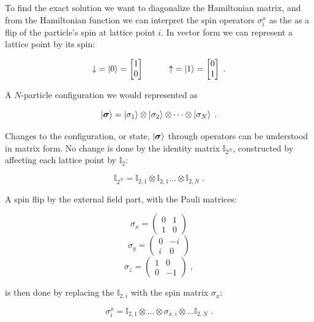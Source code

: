 To find the exact solution we want to diagonalize the Hamiltonian matrix, and from the Hamiltonian function we can interpret the spin operators $\sigma_i^x$ as the as a flip of the particle's spin at lattice point $i$. In vector form we can represent a lattice point by its spin:

\begin{equation}
  \downarrow \; = \ket{0} = \begin{bmatrix}
    1 \\ 0
    \end{bmatrix} \space\space\space\;\;\;\;\;\;\; \;\;\; \space\space\space \uparrow \; = \ket{1} = \begin{bmatrix}
  0 \\ 1
  \end{bmatrix} \; .
  \label{eq:ising_basis}
\end{equation}

A $N$-particle configuration we would represented as

$$\ket{\boldsymbol{\sigma}} = \ket{\sigma_1} \otimes \ket{\sigma_2} \otimes \dots \otimes \ket{\sigma_N} \; .$$

Changes to the configuration, or state, $\ket{\boldsymbol{\sigma}}$ through operators can be understood in matrix form. No change is done by the identity matrix $\mathbb{I}_{2^N}$, constructed by affecting each lattice point by $\mathbb{I}_2$:

$$\mathbb{I}_{2^N} = \mathbb{I}_{2, 1} \otimes \mathbb{I}_{2, 1} ... \otimes \mathbb{I}_{2, N} \; .$$

A spin flip by the external field part, with the Pauli matrices:

\[
\sigma_x =
\begin{pmatrix}0&1\\1&0\end{pmatrix}
\]
\[
\sigma_y =
\begin{pmatrix}0&-i\\i&0\end{pmatrix} 
\]
\[
\sigma_z =
\begin{pmatrix}1&0\\0&-1\end{pmatrix} \; ,
\] 

is then done by replacing the $\mathbb{I}_{2, i}$ with the spin matrix $\sigma_x$:

\begin{equation}
  \sigma_i^x = \mathbb{I}_{2, 1} \otimes \dots \otimes \sigma_{x, i} \otimes \dots \mathbb{I}_{2, N} \; .
  \label{eq:state_spin_z}
\end{equation}

